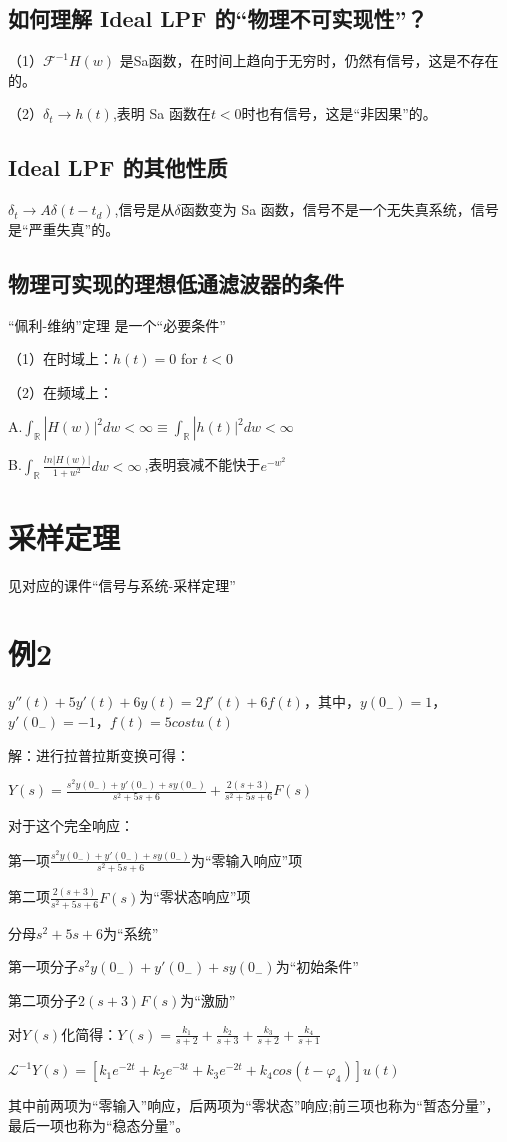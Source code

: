 \documentclass[UTF8]{ctexart}
\begin{document}
\subsection{如何理解 Ideal LPF 的“物理不可实现性”？}
（1）$ \mathscr{F}^{-1}{H(w)}$ 是Sa函数，在时间上趋向于无穷时，仍然有信号，这是不存在的。\par
（2）$\delta _t\rightarrow h(t)$,表明 Sa 函数在$t<0$时也有信号，这是“非因果”的。 \par
\subsection{ Ideal LPF 的其他性质}
$\delta _t\rightarrow A\delta (t-t_d)$,信号是从$\delta$函数变为 Sa 函数，信号不是一个无失真系统，信号是“严重失真”的。\par
\subsection{物理可实现的理想低通滤波器的条件}
“佩利-维纳”定理 \qquad  是一个“必要条件”\par
（1）在时域上：$h(t)=0$ \quad for \quad  $t<0$\par
（2）在频域上：\par
A.\quad $\int_{\mathbb{R}}| H(w)\vert^2dw<\infty\equiv \int_{\mathbb{R}}| h(t)\vert^2dw<\infty\ $\par
B.\quad $\int_{\mathbb{R}}\frac{ln| H(w)\vert }{1+w^2} dw<\infty\ $,表明衰减不能快于$e^{-w^2}$\par
\section{采样定理}
见对应的课件“信号与系统-采样定理”\par
\section{例2}
$y''(t)+5y'(t)+6y(t)=2f'(t)+6f(t)$，其中，$y(0_-)=1$，$y'(0_-)=-1$，$f(t)=5costu(t)$\par
解：进行拉普拉斯变换可得：\par
\qquad $Y(s)=\frac{s^2y(0_-)+y'(0_-)+sy(0_-)}{s^2+5s+6} +\frac{2(s+3)}{s^2+5s+6}F(s) $\par
对于这个完全响应：\par
\qquad 第一项$\frac{s^2y(0_-)+y'(0_-)+sy(0_-)}{s^2+5s+6}$为“零输入响应”项\par
\qquad 第二项$\frac{2(s+3)}{s^2+5s+6}F(s)$为“零状态响应”项\par
\qquad 分母$s^2+5s+6$为“系统”\par
\qquad 第一项分子$s^2y(0_-)+y'(0_-)+sy(0_-)$为“初始条件”\par
\qquad 第二项分子$2(s+3)F(s)$为“激励”\par
对$Y(s)$化简得：$Y(s)=\frac{k_1}{s+2}+\frac{k_2}{s+3}+\frac{k_3}{s+2}+\frac{k_4}{s+1} $\par
\qquad $\mathscr{L}^{-1}{Y(s)}=[ k_1e^{-2t}+k_2e^{-3t}+k_3e^{-2t}+k_4cos(t-\varphi _4)]u(t) $\par
其中前两项为“零输入”响应，后两项为“零状态”响应;前三项也称为“暂态分量”，最后一项也称为“稳态分量”。
\end{document}
